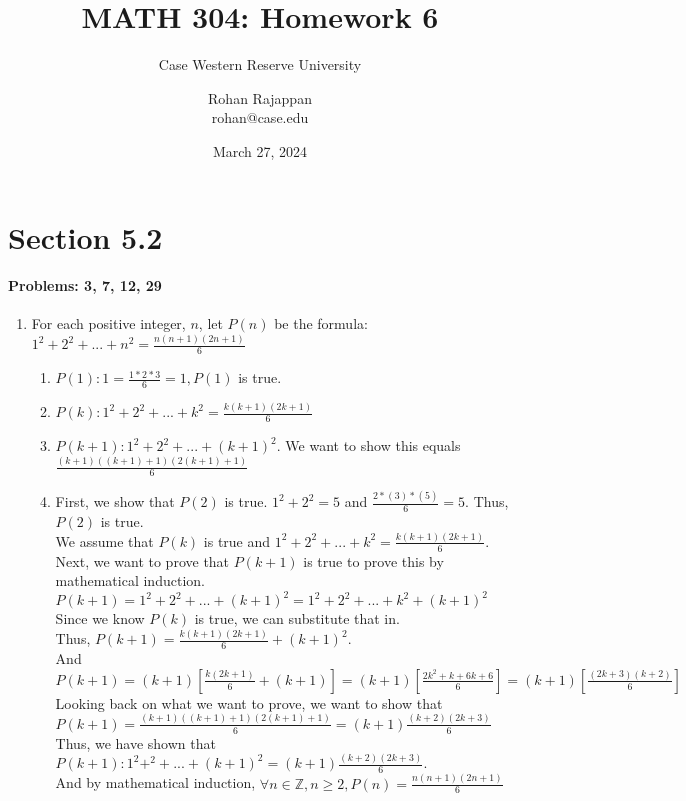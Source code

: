 \documentclass{article}
\title{MATH 304: Homework 6}
\subtitle{Case Western Reserve University}
\author{Rohan Rajappan \\rohan@case.edu}
\date{March 27, 2024}
\makeatletter
\newcommand\setItemnumber[1]{\setcounter{enum\romannumeral\@enumdepth}{\numexpr#1-1\relax}}
\makeatother
\begin{document}
\maketitle

\section{Section 5.2}
\paragraph{Problems: 3, 7, 12, 29}
\begin{enumerate}
    \setItemnumber{3}
    \item For each positive integer, $n$, let $P(n)$ be the formula:\\ $1^2+2^2+...+n^2 = \frac{n(n+1)(2n+1)}{6}$
    \begin{enumerate}
        \item $P(1): 1 = \frac{1*2*3}{6} = 1, P(1)$ is true.
        \item $P(k): 1^2+2^2+...+k^2 = \frac{k(k+1)(2k+1)}{6} $
        \item $P(k+1):1^2+2^2+...+(k+1)^2$. We want to show this equals $\frac{(k+1)((k+1)+1)(2(k+1)+1)}{6}$
        \item First, we show that $P(2)$ is true. $1^2+2^2 = 5$ and $\frac{2*(3)*(5)}{6} = 5$. Thus, $P(2)$ is true.\\
        We assume that $P(k)$ is true and $1^2+2^2+...+k^2 = \frac{k(k+1)(2k+1)}{6}$. \\
        Next, we want to prove that $P(k+1)$ is true to prove this by mathematical induction. $P(k+1)=1^2+2^2+...+(k+1)^2 =1^2+2^2+...+k^2+(k+1)^2 $ \\
        Since we know $P(k)$ is true, we can substitute that in. \\Thus, $P(k+1) = \frac{k(k+1)(2k+1)}{6}+(k+1)^2 $.\\
        And $P(k+1) = (k+1)[\frac{k(2k+1)}{6}+(k+1)] = (k+1)[\frac{2k^2+k+6k+6}{6}] = (k+1)[\frac{(2k+3)(k+2)}{6}]$\\
        Looking back on what we want to prove, we want to show that $P(k+1) = \frac{(k+1)((k+1)+1)(2(k+1)+1)}{6} = (k+1)\frac{(k+2)(2k+3)}{6}$\\
        Thus, we have shown that \\$P(k+1): 1^2+^2+...+(k+1)^2 = (k+1)\frac{(k+2)(2k+3)}{6}$. \\And by mathematical induction, $\forall n\in\mathbb{Z}, n\geq2, P(n) = \frac{n(n+1)(2n+1)}{6}$

\end{enumerate}
\end{enumerate}
\end{document}
